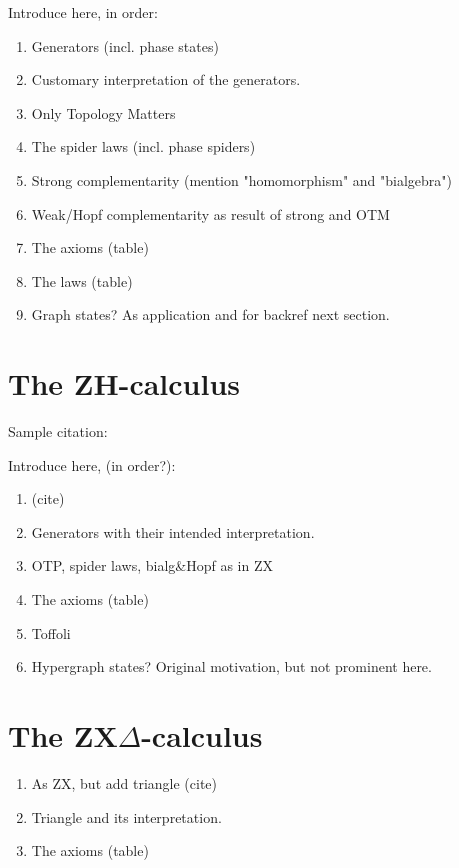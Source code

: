 \begin{TODOLIST}
Introduce here, in order:
\begin{enumerate}
\item Generators (incl. phase states)
\item Customary interpretation of the generators.
\item Only Topology Matters
\item The spider laws (incl. phase spiders)
\item Strong complementarity (mention "homomorphism" and "bialgebra")
\item Weak/Hopf complementarity as result of strong and OTM
\item The axioms (table)
\item The laws (table)
\item Graph states? As application and for backref next section.
\end{enumerate}
\end{TODOLIST}

\section{The ZH-calculus}\label{sec:zh-background}

Sample citation: \cite{backens2018zhcalculus}
\begin{TODOLIST}
Introduce here, (in order?):
\begin{enumerate}
\item (cite)
\item Generators with their intended interpretation.
\item OTP, spider laws, bialg\&Hopf as in ZX
\item The axioms (table)
\item Toffoli
\item Hypergraph states? Original motivation, but not prominent here.
\end{enumerate} 
\end{TODOLIST}

\section{The ZX$\Delta$-calculus}\label{sec:zxd-background}

\begin{TODOLIST}
\begin{enumerate}
\item As ZX, but add triangle (cite)
\item Triangle and its interpretation.
\item The axioms (table)
\end{enumerate}
\end{TODOLIST}

